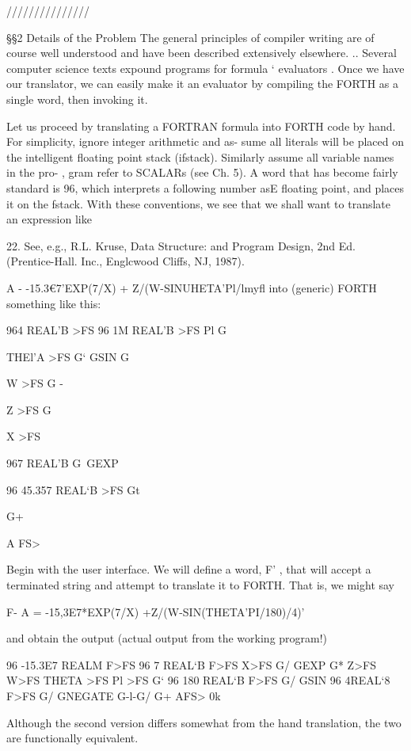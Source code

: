 ///////////////

§§2 Details of the Problem
The general principles of compiler writing are of course well
understood and have been described extensively elsewhere. ..
Several computer science texts expound programs for formula ‘
evaluators . Once we have our translator, we can easily make it
an evaluator by compiling the FORTH as a single word, then
invoking it.

 

Let us proceed by translating a FORTRAN formula into FORTH
code by hand. For simplicity, ignore integer arithmetic and as-
sume all literals will be placed on the intelligent ﬂoating point
stack (ifstack). Similarly assume all variable names in the pro- ,
gram refer to SCALARs (see Ch. 5). A word that has become
fairly standard is 96, which interprets a following number asE
ﬂoating point, and places it on the fstack. With these conventions,
we see that we shall want to translate an expression like

 

22. See, e.g., R.L. Kruse, Data Structure: and Program Design, 2nd Ed. (Prentice-Hall. Inc.,
Englcwood Cliffs, NJ, 1987).

A - -15.3€7'EXP(7/X) + Z/(W-SINUHETA'Pl/lmyﬂ
into (generic) FORTH something like this:

964 REAL’B >FS
96 1M REAL'B >FS
Pl G\

THEl’A >FS G‘
GSIN G

W >FS G -

Z >FS G\

X >FS

967 REAL'B G\
GEXP

96 45.357 REAL‘B >FS
Gt

G+

A FS>

Begin with the user interface. We will deﬁne a word, F' , that
will accept a terminated string and attempt to translate it to
FORTH. That is, we might say

F- A = -15,3E7*EXP(7/X) +Z/(W-SIN(THETA'PI/180)/4)'

and obtain the output (actual output from the working program!)

96 -15.3E7 REALM F>FS 96 7 REAL‘B F>FS
X>FS G/ GEXP G* Z>FS W>FS
THETA >FS Pl >FS G‘ 96 180 REAL‘B F>FS
G/ GSIN 96 4REAL‘8 F>FS G/ GNEGATE
G-l-G/ G+ AFS> 0k

Although the second version differs somewhat from the hand
translation, the two are functionally equivalent.

